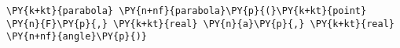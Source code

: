 \begin{Verbatim}[commandchars=\\\{\}]
    \PY{k+kt}{parabola} \PY{n+nf}{parabola}\PY{p}{(}\PY{k+kt}{point} \PY{n}{F}\PY{p}{,} \PY{k+kt}{real} \PY{n}{a}\PY{p}{,} \PY{k+kt}{real} \PY{n+nf}{angle}\PY{p}{)}
\end{Verbatim}
